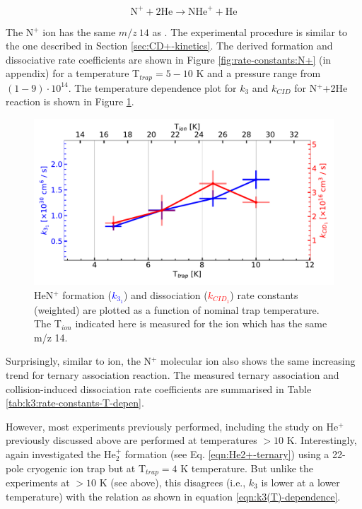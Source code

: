\[ \text{N}^+ + 2\text{He} \rightarrow \text{NHe}^+ + \text{He}\]

The N$^+$ ion has the same $m/z\ 14$ as \CD. The experimental procedure is
similar to the one described in Section \ref{sec:CD+-kinetics}. The derived
formation and dissociative rate coefficients are shown in Figure
\ref{fig:rate-constants:N+} (in appendix) for a temperature T$_{trap}=5-10$ K
and a pressure range from $(1 - 9 ) \cdot 10^{14}$\percc. The temperature
dependence plot for $k_3$ and $k_{CID}$ for N$^+$+2He reaction is shown in
Figure \ref{fig:HeN+:rate-constants-f(t)}.

\begin{figure}[!htb]
    \centering
    \includegraphics[width=1\textwidth]{figures/measurements/kinetics/functionOf_T/N+/off_k3_kCID_as_functionOfT_with_Tcol.pdf}
    \caption{HeN$^+$ formation (\textcolor{blue}{$k_{3_1}$}) and dissociation (\textcolor{red}{$k_{CID_1}$}) rate constants (weighted) are plotted as a function of nominal trap temperature. The T$_{ion}$ indicated here is measured for the \CD ion which has the same m/z 14.}
    \label{fig:HeN+:rate-constants-f(t)}
\end{figure}


Surprisingly, similar to \CD ion, the N$^+$ molecular ion also shows the same increasing trend for ternary association reaction. The measured ternary association and collision-induced dissociation rate coefficients are summarised in Table \ref{tab:k3:rate-constants-T-depen}.

However, most experiments previously performed, including the study on He$^+$
previously discussed above are performed at temperatures $>10$ K.
Interestingly, \citet{gerlich_infrared_2018} again investigated the He$_2^+$
formation (see Eq. \ref{eqn:He2+-ternary}) using a 22-pole cryogenic ion trap
but at T$_{trap}=4$ K temperature. But unlike the experiments at $>10$ K (see
above), this disagrees (i.e., $k_3$ is lower at a lower temperature) with the
relation as shown in equation \ref{eqn:k3(T)-dependence}.

